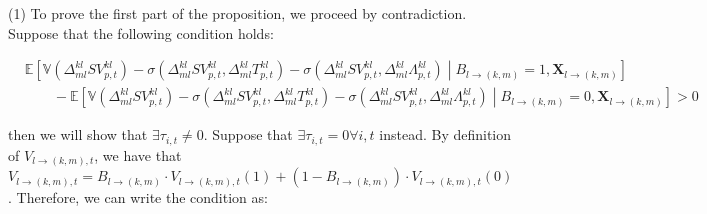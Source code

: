 (1) To prove the first part of the proposition, we proceed by contradiction. Suppose that the following condition holds: 
\begin{linenomath*}
    \begin{equation*}
        \begin{aligned}
            & \mathbb{E}
                \left[
                    \mathbb{V}\left(\Delta_{ml}^{kl}SV_{p,t}^{kl}\right)
                        - \sigma\left(\Delta_{ml}^{kl}SV_{p,t}^{kl},\Delta_{ml}^{kl}T_{p,t}^{kl}\right)
                        - \sigma\left(\Delta_{ml}^{kl}SV_{p,t}^{kl},\Delta_{ml}^{kl}\Lambda_{p,t}^{kl}\right)
                    \middle\vert  B_{l \rightarrow (k,m)} = 1, \boldsymbol{X}_{l \rightarrow (k,m)}
                \right] \\
            & \qquad -  
                \mathbb{E}
                \left[
                    \mathbb{V}\left(\Delta_{ml}^{kl}SV_{p,t}^{kl}\right) 
                        - \sigma\left(\Delta_{ml}^{kl}SV_{p,t}^{kl},\Delta_{ml}^{kl}T_{p,t}^{kl}\right)
                        - \sigma\left(\Delta_{ml}^{kl}SV_{p,t}^{kl},\Delta_{ml}^{kl}\Lambda_{p,t}^{kl}\right)
                    \middle\vert  B_{l \rightarrow (k,m)} = 0, \boldsymbol{X}_{l \rightarrow (k,m)}
                \right] > 0
        \end{aligned}
    \end{equation*}
\end{linenomath*}
then we will show that $\exists \tau_{i,t} \neq 0$. Suppose that $\exists \tau_{i,t} = 0 \forall i,t$ instead. By definition of $V_{l \rightarrow (k,m),t}$, we have that $V_{l \rightarrow (k,m),t} = B_{l \rightarrow (k,m)}\cdot V_{l \rightarrow (k,m),t}(1) + \left(1-B_{l \rightarrow (k,m)}\right)\cdot V_{l \rightarrow (k,m),t}(0)$. Therefore, we can write the condition as:
